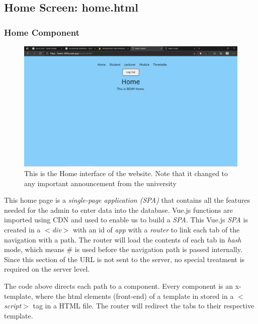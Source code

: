 \documentclass[../report.tex]{subfiles}
\begin{document}
\subsection{Home Screen: home.html}
\subsubsection{Home Component}
\begin{figure}[H]
	\centering
	\includegraphics[width=.7\linewidth]{../images/07/01-02-home.png}
	\caption{This is the Home interface of the website. Note that it changed to any important announcement from the university}
	\label{fig:07-01-02-home}
\end{figure}



This home page is a \textit{single-page application (SPA)} that contains all the features needed for the admin to enter data into the database. Vue.js functions are imported using CDN and used to enable us to build a \textit{SPA}. This Vue.js \textit{SPA} is created in a \textit{$<$div$>$} with an id of \textit{app} with a \textit{router} to link each tab of the navigation with a path. The router will load the contents of each tab in \textit{hash} mode, which means \# is used before the navigation path is passed internally. Since this section of the URL is not sent to the server, no special treatment is required on the server level.
 
The code above directs each path to a component. Every component is an x-template, where the html elements (front-end) of a template in stored in a \textit{$<$script$>$} tag in a HTML file. The router will redirect the tabs to their respective template.

\bigskip
\end{document}
